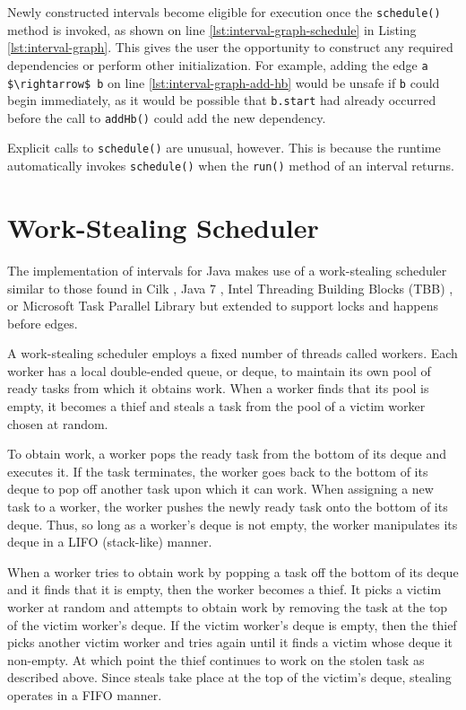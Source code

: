 Newly constructed intervals become eligible for execution once the
\lstinline|schedule()| method is invoked, as shown on line
\ref{lst:interval-graph-schedule} in Listing
\ref{lst:interval-graph}. This gives the user the opportunity to
construct any required dependencies or perform other
initialization. For example, adding the edge
\lstinline|a $\rightarrow$ b| on line \ref{lst:interval-graph-add-hb}
would be unsafe if \lstinline|b| could begin immediately, as it would
be possible that \lstinline|b.start| had already occurred before the
call to \lstinline|addHb()| could add the new dependency.

Explicit calls to \lstinline|schedule()| are unusual, however. This is
because the runtime automatically invokes \lstinline|schedule()| when
the \lstinline|run()| method of an interval returns.


\section{Work-Stealing Scheduler}
\label{sec:intro-work-stealing-scheduler}

The implementation of intervals for Java makes use of a work-stealing
scheduler similar to those found in Cilk \cite{Blumofe1995,
  Frigo1998}, Java 7 \cite{Lea2000, Lea2000a, Lea2004, Lea2006}, Intel
Threading Building Blocks (TBB) \cite{Reinders2007, Contreras2008}, or
Microsoft Task Parallel Library \cite{Leijen2009} but extended to
support locks and happens before edges.

A work-stealing scheduler employs a fixed number of threads called
workers. Each worker has a local double-ended queue, or deque, to
maintain its own pool of ready tasks from which it obtains work. When
a worker finds that its pool is empty, it becomes a thief and steals a
task from the pool of a victim worker chosen at random.

To obtain work, a worker pops the ready task from the bottom of its
deque and executes it. If the task terminates, the worker goes back to
the bottom of its deque to pop off another task upon which it can
work. When assigning a new task to a worker, the worker pushes the
newly ready task onto the bottom of its deque. Thus, so long as a
worker's deque is not empty, the worker manipulates its deque in a
LIFO (stack-like) manner.

When a worker tries to obtain work by popping a task off the bottom of
its deque and it finds that it is empty, then the worker becomes a
thief. It picks a victim worker at random and attempts to obtain work
by removing the task at the top of the victim worker's deque. If the
victim worker's deque is empty, then the thief picks another victim
worker and tries again until it finds a victim whose deque it
non-empty. At which point the thief continues to work on the stolen
task as described above. Since steals take place at the top of the
victim's deque, stealing operates in a FIFO manner.

